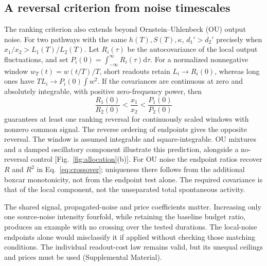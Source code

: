\documentclass[aps,10pt,onecolumn,superscriptaddress,nofootinbib,longbibliography,
  amsmath,amssymb,floatfix]{revtex4-2}
\newcommand{\dd}{\mathrm{d}}
\begin{document}
\subsection{A reversal criterion from noise timescales}

The ranking criterion also extends beyond Ornstein--Uhlenbeck
(OU) output noise.
For two pathways with the same \(h(T),S(T),\kappa\),
\(d_1'>d_2'\) precisely when \(x_1/x_2>L_1(T)/L_2(T)\).
Let \(R_i(\tau)\) be the autocovariance of the local output
fluctuations, and set \(P_i(0)=\int_{-\infty}^{\infty}R_i(\tau)\dd\tau\).
For a normalized nonnegative window \(w_T(t)=w(t/T)/T\),
short readouts retain \(L_i\to R_i(0)\), whereas long ones have
\(T L_i\to P_i(0)\int w^2\). If the covariances are continuous
at zero and absolutely integrable, with positive zero-frequency
power, then
\begin{equation}
 \frac{R_1(0)}{R_2(0)}<\frac{x_1}{x_2}
                 <\frac{P_1(0)}{P_2(0)}
 \label{eq:spectralreversal}
\end{equation}
guarantees at least one ranking reversal for continuously scaled
windows with nonzero common signal. The reverse ordering of
endpoints gives the opposite reversal. The window is assumed
integrable and square-integrable. OU mixtures and a damped
oscillatory component illustrate this prediction, alongside a
no-reversal control [Fig.~\ref{fig:allocation}(b)]. For OU noise
the endpoint ratios recover \(R\) and \(R^2\) in
Eq.~\eqref{eq:crossover}; uniqueness there follows from the
additional boxcar monotonicity, not from the endpoint test alone.
The required covariance is that of the local component, not the
unseparated total spontaneous activity.

The shared signal, propagated-noise and price coefficients matter.
Increasing only one source-noise intensity fourfold, while retaining
the baseline budget ratio, produces an example with no crossing
over the tested durations. The local-noise endpoints alone would
misclassify it if applied without checking those matching conditions.
The individual readout-cost law remains valid, but its unequal
ceilings and prices must be used (Supplemental Material).
\end{document}
